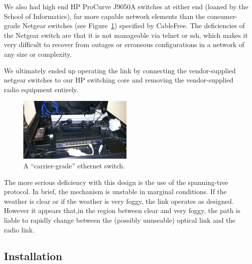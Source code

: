 \documentclass{amsart}
\begin{document}
We also had high end HP ProCurve J9050A switches at either end (loaned
by the School of Informatics), far more capable network elements than
the consumer-grade Netgear switches (see
Figure~\ref{fig:carrier-grade}) specified by CableFree. The
deficiencies of the Netgear switch are that it is not manageable via
telnet or ssh, which makes it very difficult to recover from outages
or erroneous configurations in a network of any size or complexity.

 We ultimately ended up operating the link by
connecting the vendor-supplied netgear switches to our HP switching
core and removing the vendor-supplied radio equipment entirely.
\begin{figure}
  \begin{center}
    \includegraphics[width=0.5\textwidth]{carrier-grade-s}
  \end{center}
  \caption{A ``carrier-grade'' ethernet switch.}
  \label{fig:carrier-grade}
\end{figure}

The more serious deficiency with this design is the use of the
spanning-tree protocol. In brief, the mechanism is unstable in marginal
conditions. If the weather is clear or if the weather is very foggy,
the link operates as designed. However it appears that,in the region between clear and
very foggy, the path is liable to rapidly change between the (possibly
unuseable) optical link and the radio link. 



\subsection{Installation}
\label{sec:fittings}
\end{document}
